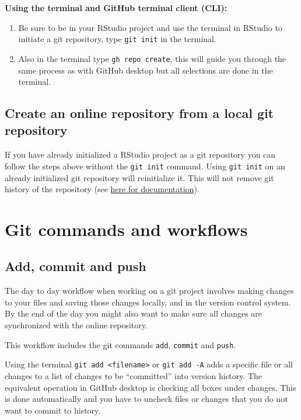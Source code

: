 \documentclass[
  11pt,
  letterpaper,
]{scrbook}
\providecommand{\tightlist}{%
  \setlength{\itemsep}{0pt}\setlength{\parskip}{0pt}}\usepackage{longtable,booktabs,array}
\begin{document}
\textbf{Using the terminal and GitHub terminal client (CLI):}

\begin{enumerate}
\def\labelenumi{\arabic{enumi}.}
\tightlist
\item
  Be sure to be in your RStudio project and use the terminal in RStudio
  to initiate a git repository, type \texttt{git\ init} in the terminal.
\item
  Also in the terminal type \texttt{gh\ repo\ create}, this will guide
  you through the same process as with GitHub desktop but all selections
  are done in the terminal.
\end{enumerate}

\hypertarget{create-an-online-repository-from-a-local-git-repository}{%
\subsection{Create an online repository from a local git
repository}\label{create-an-online-repository-from-a-local-git-repository}}

If you have already initialized a RStudio project as a git repository
you can follow the steps above without the \texttt{git\ init} command.
Using \texttt{git\ init} on an already initialized git repository will
reinitialize it. This will not remove git history of the repository (see
\href{https://git-scm.com/docs/git-init}{here for documentation}).

\hypertarget{git-commands-and-workflows}{%
\section{Git commands and workflows}\label{git-commands-and-workflows}}

\hypertarget{add-commit-and-push}{%
\subsection{Add, commit and push}\label{add-commit-and-push}}

The day to day workflow when working on a git project involves making
changes to your files and saving those changes locally, and in the
version control system. By the end of the day you might also want to
make sure all changes are synchronized with the online repository.

This workflow includes the git commands \texttt{add}, \texttt{commit}
and \texttt{push}.

Using the terminal \texttt{git\ add\ \textless{}filename\textgreater{}}
or \texttt{git\ add\ -A} adds a specific file or all changes to a list
of changes to be ``committed'' into version history. The equivalent
operation in GitHub desktop is checking all boxes under changes. This is
done automatically and you have to uncheck files or changes that you do
not want to commit to history.
\end{document}
